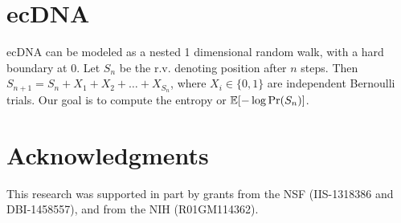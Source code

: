 \documentclass[11pt]{article}
\begin{document}
\section{ecDNA}
\begin{packed_enum}
  \item ecDNA can be modeled as a nested 1 dimensional random walk,
    with a hard boundary at $0$. Let $S_n$ be the r.v. denoting
    position after $n$ steps. Then $S_{n+1}=S_n+X_1+X_2+\ldots+X_{S_n}$,
    where $X_i\in\{0,1\}$ are independent Bernoulli trials.  Our goal
      is to compute the entropy or $\mathbb{E}[-\log \Pr(S_n)]$.
\end{packed_enum}

\section*{Acknowledgments}
This research was supported in part by grants from the NSF
(IIS-1318386 and DBI-1458557), and from the NIH (R01GM114362).
\clearpage
\newpage
%

%


%
\end{document}
